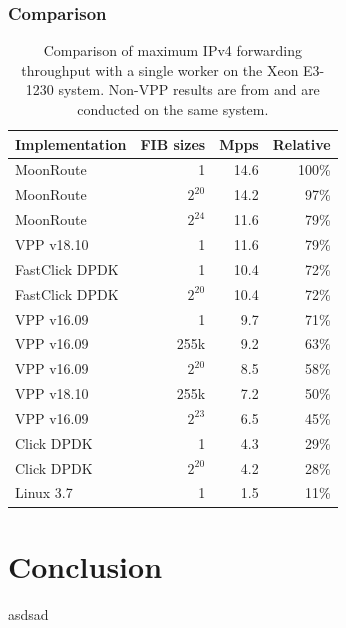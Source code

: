 \begin{frame}
    \frametitle{Comparison}
    \begin{table}
        \begin{tabular}[]{ l r r r }
            Implementation   & FIB sizes & Mpps     & Relative \\ 
            \midrule
            MoonRoute        & 1         & 14.6     & 100\% \\
            MoonRoute        & $2^{20}$  & 14.2     & 97\% \\
            MoonRoute        & $2^{24}$  & 11.6     & 79\% \\
            VPP v18.10       & 1         & 11.6     & 79\% \\
            FastClick DPDK   & 1         & 10.4     & 72\% \\
            FastClick DPDK   & $2^{20}$  & 10.4     & 72\% \\
            VPP v16.09       & 1         & 9.7      & 71\% \\
            VPP v16.09       & 255k      & 9.2      & 63\% \\
            VPP v16.09       & $2^{20}$  & 8.5      & 58\% \\
            VPP v18.10       & 255k      & 7.2      & 50\% \\
            VPP v16.09       & $2^{23}$  & 6.5      & 45\% \\
            Click DPDK       & 1         & 4.3      & 29\% \\
            Click DPDK       & $2^{20}$  & 4.2      & 28\% \\
            Linux 3.7        & 1         & 1.5      & 11\% \\

            \midrule
        \end{tabular}
        \caption{Comparison of maximum IPv4 forwarding throughput with a single worker on the Xeon E3-1230 system. Non-VPP results are from \cite{chair:architecture} and are conducted on the same system. }
        \label{table:comparison}
    \end{table}
\end{frame}

\section{Conclusion}

\begin{frame}
asdsad
\end{frame}


